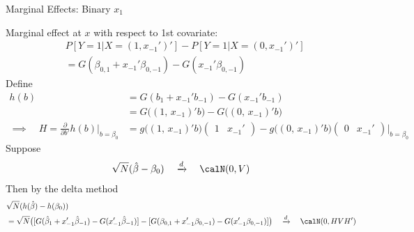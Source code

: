 \documentclass[handout]{beamer}
\newcommand{\dto}{\xrightarrow{d}}
\begin{document}
\begin{frame}[shrink]{Marginal Effects: Binary $x_1$}

Marginal effect at $x$ with respect to 1st covariate:
\begin{align*}
  &
  P[Y=1|X=(1,x_{-1}')']
  -
  P[Y=1|X=(0,x_{-1}')']
  \\
  &=
  G(\beta_{0,1} + x_{-1}'\beta_{0,-1})
  -
  G(x_{-1}'\beta_{0,-1})
\end{align*}
Define
\begin{align*}
  h(b)
  &=
  G(b_1 + x_{-1}'b_{-1})
  -
  G(x_{-1}'b_{-1})
  \\
  &=
  G\big(
  (1,\,x_{-1})'b
  \big)
  -
  G\big(
  (0,\,x_{-1})'b
  \big)
  \\
  \implies\quad
  H=
  \frac{\partial}{\partial b'}
  h(b)
  \bigg|_{b=\beta_0}
  &=
  g\big(
  (1,\,x_{-1})'b
  \big)
  \begin{pmatrix}
    1 & x_{-1}'
  \end{pmatrix}
  -
  g\big(
  (0,\,x_{-1})'b
  \big)
  \begin{pmatrix}
    0 & x_{-1}'
  \end{pmatrix}
  \bigg|_{b=\beta_0}
\end{align*}
Suppose
\begin{align*}
  \sqrt{N}(\hat{\beta}-\beta_0)
  \quad\dto\quad
  \calN(0,V)
\end{align*}
Then by the delta method
\begin{align*}
  &\sqrt{N}(h(\hat{\beta})-h(\beta_0))
  \\
  &=
  \sqrt{N}\big(
    [
    G(\hat{\beta}_{1} + x_{-1}'\hat{\beta}_{-1})
    -
    G(x_{-1}'\hat{\beta}_{-1})
    ]
    -
    [
    G(\beta_{0,1} + x_{-1}'\beta_{0,-1})
    -
    G(x_{-1}'\beta_{0,-1})
    ]
  \big)
  \quad\dto\quad
  \calN(0,HVH')
\end{align*}
\end{frame}
\end{document}
